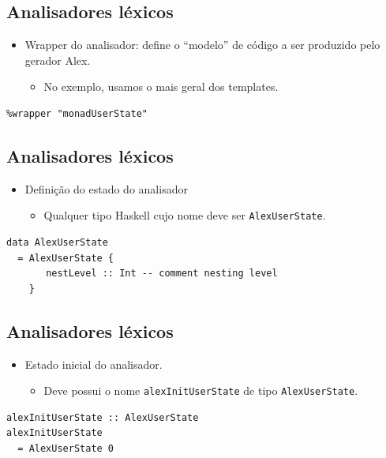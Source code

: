 \documentclass[11pt]{article}
\begin{document}
\subsection*{Analisadores léxicos}
\label{sec:orgb718c42}

\begin{itemize}
\item Wrapper do analisador: define o ``modelo'' de código a ser produzido pelo gerador Alex.
\begin{itemize}
\item No exemplo, usamos o mais geral dos templates.
\end{itemize}
\end{itemize}

\begin{verbatim}
%wrapper "monadUserState"
\end{verbatim}
\subsection*{Analisadores léxicos}
\label{sec:org88dc4ac}

\begin{itemize}
\item Definição do estado do analisador
\begin{itemize}
\item Qualquer tipo Haskell cujo nome deve ser \texttt{AlexUserState}.
\end{itemize}
\end{itemize}

\begin{verbatim}
data AlexUserState
  = AlexUserState {
       nestLevel :: Int -- comment nesting level
    }
\end{verbatim}
\subsection*{Analisadores léxicos}
\label{sec:org559ffd0}

\begin{itemize}
\item Estado inicial do analisador.
\begin{itemize}
\item Deve possui o nome \texttt{alexInitUserState} de tipo \texttt{AlexUserState}.
\end{itemize}
\end{itemize}

\begin{verbatim}
alexInitUserState :: AlexUserState
alexInitUserState
  = AlexUserState 0
\end{verbatim}
\end{document}
